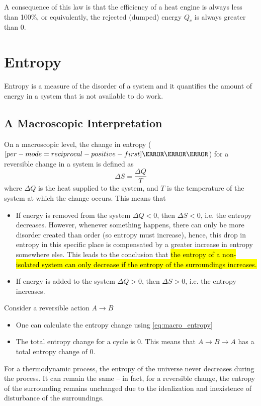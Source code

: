 \documentclass[a4paper,12pt]{article}
\let\oldsection\section
\renewcommand\section{\clearpage\oldsection}
\let\oldsi\si
\renewcommand{\si}[1]{\oldsi[per-mode=reciprocal-positive-first]{#1}}
\begin{document}
A consequence of this law is that the efficiency of a heat engine is always less than 100\%, or equivalently, the rejected (dumped) energy $Q_c$ is always greater than 0.

\section{Entropy}

Entropy is a measure of the disorder of a system and it quantifies the amount of energy in a system that is not available to do work.

\subsection{A Macroscopic Interpretation}

On a macroscopic level, the change in entropy ($\si{\joule\per\kelvin}$) for a reversible change in a system is defined as
\begin{equation}\label{eq:macro_entropy}
  \Delta S = \dfrac{\Delta Q}{T}
\end{equation}
where $\Delta Q$ is the heat supplied to the system, and $T$ is the temperature of the system at which the change occurs. This means that
\begin{itemize}
  \item If energy is removed from the system $\Delta Q < 0$, then $\Delta S < 0$, i.e. the entropy decreases. However, whenever something happens, there can only be more disorder created than order (so entropy must increase), hence, this drop in entropy in this specific place is compensated by a greater increase in entropy somewhere else. This leads to the conclusion that \hl{the entropy of a non-isolated system can only decrease if the entropy of the surroundings increases.}
  \item If energy is added to the system $\Delta Q > 0$, then $\Delta S > 0$, i.e. the entropy increases.
\end{itemize}
Consider a reversible action $A \rightarrow B$
\begin{itemize}
  \item One can calculate the entropy change using \cref{eq:macro_entropy}
  \item The total entropy change for a cycle is 0. This means that $A\rightarrow B \rightarrow A$ has a total entropy change of 0.
\end{itemize}
For a thermodynamic process, the entropy of the universe never decreases during the process. It can remain the same -- in fact, for a reversible change, the entropy of the surrounding remains unchanged due to the idealization and inexistence of disturbance of the surroundings.
\end{document}
